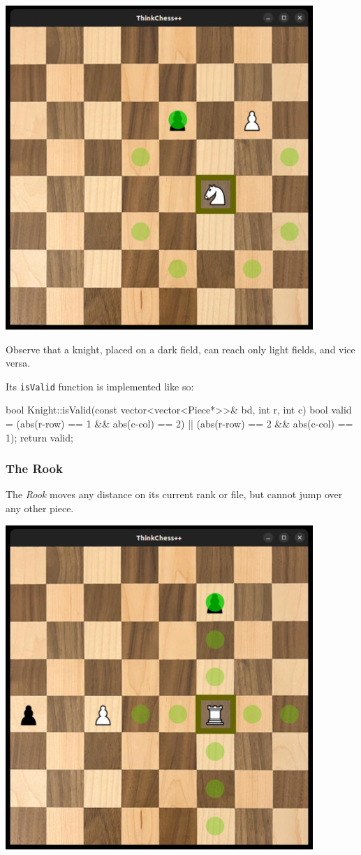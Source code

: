 \begin{center}
\includegraphics[width=.5\linewidth]{img/knight.jpg}
\end{center}

Observe that a knight, placed on a dark field, can reach only light fields, and vice versa.

Its \texttt{isValid} function is implemented like so:

\begin{cpp}
bool Knight::isValid(const vector<vector<Piece*>>& bd, int r, int c) {
  bool valid = (abs(r-row) == 1 && abs(c-col) == 2) ||
               (abs(r-row) == 2 && abs(c-col) == 1);
  return valid;
}
\end{cpp}

\subsubsection{The Rook}
The \emph{Rook} moves any distance on its current rank or file, but cannot jump over any other piece.

\begin{center}
\includegraphics[width=.5\linewidth]{img/rook.jpg}
\end{center}

